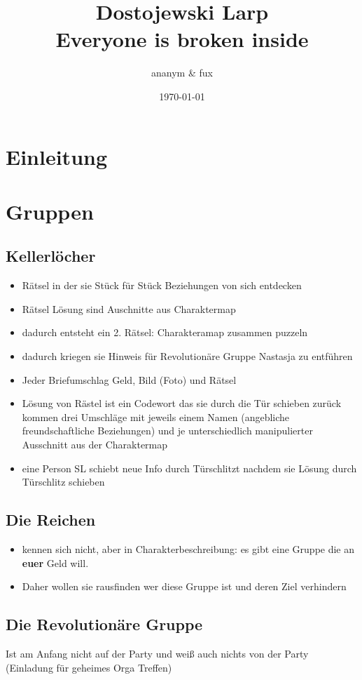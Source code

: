 \documentclass[12pt, a4paper, openany]{report}
\title{
  {\large{Dostojewski Larp}}\\
    {Everyone is broken inside}\\
    {\bigskip}
}
\author{ananym \& fux}
\date{\today}
\begin{document}
\maketitle 
\tableofcontents
\chapter{Einleitung}

\chapter{Gruppen}
\section{Kellerlöcher}
\begin{itemize}
\item Rätsel in der sie Stück für Stück Beziehungen von sich entdecken 
\item Rätsel Lösung sind Auschnitte aus Charaktermap
\item dadurch entsteht ein 2. Rätsel: Charakteramap zusammen puzzeln 
\item dadurch kriegen sie Hinweis für Revolutionäre Gruppe Nastasja zu entführen
\item Jeder Briefumschlag Geld, Bild (Foto) und Rätsel 
\item Lösung von Rästel ist ein Codewort das sie durch die Tür schieben zurück kommen drei Umschläge mit jeweils einem Namen (angebliche freundschaftliche Beziehungen) und je unterschiedlich manipulierter Ausschnitt aus der Charaktermap
\item eine Person SL schiebt neue Info durch Türschlitzt nachdem sie Lösung durch Türschlitz schieben 
\end{itemize}
 
\section{Die Reichen}
\begin{itemize}
\item kennen sich nicht, aber in Charakterbeschreibung: es gibt eine Gruppe die an \textbf{euer} Geld will. 
\item Daher wollen sie rausfinden wer diese Gruppe ist und deren Ziel verhindern
\end{itemize}

\section{Die Revolutionäre Gruppe}
Ist am Anfang nicht auf der Party und weiß auch nichts von der Party (Einladung
für geheimes Orga Treffen)
\end{document}
